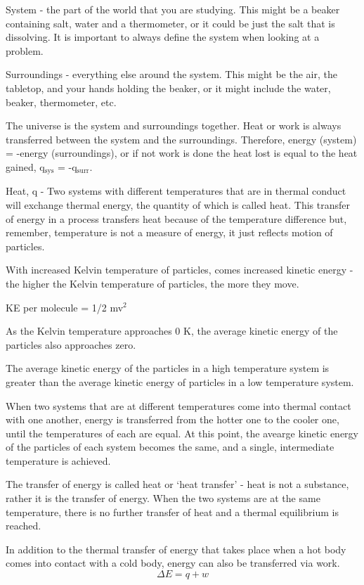 \documentclass[../chem.tex]{subfiles}
\begin{document}
System - the part of the world that you are studying. This might be a beaker containing salt, water and a thermometer, or it could be just the salt that is dissolving. It is important to always define the system when looking at a problem.

Surroundings - everything else around the system. This might be the air, the tabletop, and your hands holding the beaker, or it might include the water, beaker, thermometer, etc.

The universe is the system and surroundings together. Heat or work is always transferred between the system and the surroundings. Therefore, energy (system) = -energy (surroundings), or if not work is done the heat lost is equal to the heat gained, q$_{\text{sys}}$ = -q$_{\text{surr}}$.

Heat, q - Two systems with different temperatures that are in thermal conduct will exchange thermal energy, the quantity of which is called heat. This transfer of energy in a process 
transfers heat because of the temperature difference but, remember, temperature is not a measure of energy, it just reflects motion of particles. 

With increased Kelvin temperature of particles, comes increased kinetic energy - the higher the Kelvin temperature of particles, the more they move.
\begin{center}
    KE per molecule = 1/2 mv$^2$
\end{center}

As the Kelvin temperature approaches 0 K, the average kinetic energy of the particles also approaches zero.

The average kinetic energy of the particles in a high temperature system is greater than the average kinetic energy of particles in a low temperature system.

When two systems that are at different temperatures come into thermal contact with one another, energy is transferred from the hotter one to the cooler one, 
until the temperatures of each are equal. At this point, the avearge kinetic energy of the particles of each system becomes the same, and a single, intermediate temperature is achieved.

The transfer of energy is called heat or `heat transfer' - heat is not a substance, rather it is the transfer of energy. When the two systems are at the same temperature, there is no further transfer of heat and a thermal equilibrium is reached.

In addition to the thermal transfer of energy that takes place when a hot body comes into contact with a cold body, energy can also be transferred via work.
\[\Delta E = q+w\]
\end{document}
